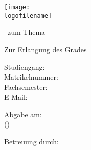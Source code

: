 \begin{titlepage}

   \singlespacing

   \begin{center} \large 
    
    \universityname
    \vspace*{0.5cm}
    
    \facultyname
    \vspace*{1.5cm}
    
	\texttt{[image: \\logofilename]}
    \vspace*{2cm} 

	\thesistype \ zum Thema
	\vspace*{0.5cm}
	
    {\huge\textbf{\thesistitle}}
    \vspace*{1.5cm}
    
    
  	Zur Erlangung des Grades \studygoal
  	\vspace*{1.5cm}

    \textbf{\thesisauthor}
    \vspace*{0.5cm}
    
    Studiengang: \studytype \\
    Matrikelnummer: \studentnumber \\
    Fachsemester: \semesternumber \\
    E-Mail: \mail \\
    \vspace*{2.0cm}

    Abgabe am: \submissiondate \\
    (\semester)
    \vspace*{1.5cm}

    Betreuung durch: \supervisor
  \end{center}
\end{titlepage}